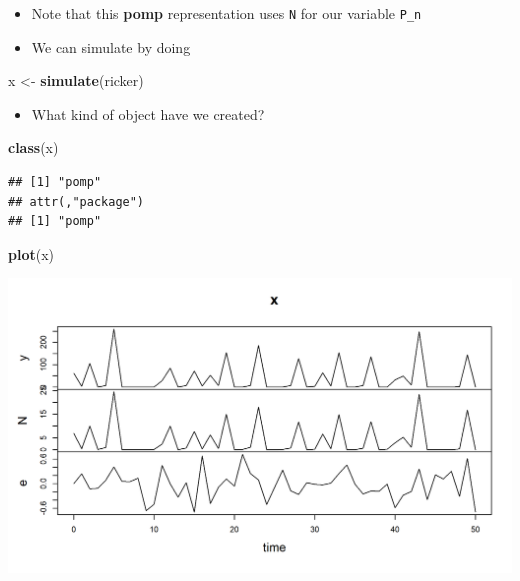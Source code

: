 \documentclass[]{article}
\newenvironment{Shaded}{\begin{snugshade}}{\end{snugshade}}
\newcommand{\KeywordTok}[1]{\textcolor[rgb]{0.13,0.29,0.53}{\textbf{#1}}}
\newcommand{\StringTok}[1]{\textcolor[rgb]{0.31,0.60,0.02}{#1}}
\newcommand{\NormalTok}[1]{#1}
\providecommand{\tightlist}{%
  \setlength{\itemsep}{0pt}\setlength{\parskip}{0pt}}
\begin{document}
\begin{itemize}
\item
  Note that this \textbf{pomp} representation uses \texttt{N} for our
  variable \texttt{P\_n}
\item
  We can simulate by doing
\end{itemize}

\begin{Shaded}
\begin{Highlighting}[]
\NormalTok{x <-}\StringTok{ }\KeywordTok{simulate}\NormalTok{(ricker)}
\end{Highlighting}
\end{Shaded}

\begin{itemize}
\tightlist
\item
  What kind of object have we created?
\end{itemize}

\begin{Shaded}
\begin{Highlighting}[]
\KeywordTok{class}\NormalTok{(x)}
\end{Highlighting}
\end{Shaded}

\begin{verbatim}
## [1] "pomp"
## attr(,"package")
## [1] "pomp"
\end{verbatim}

\begin{Shaded}
\begin{Highlighting}[]
\KeywordTok{plot}\NormalTok{(x)}
\end{Highlighting}
\end{Shaded}


\begin{center}\includegraphics{figure/intro-unnamed-chunk-1-1} \end{center}
\end{document}
